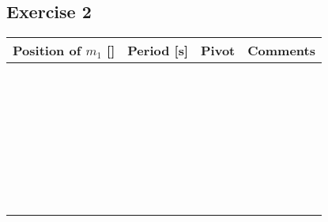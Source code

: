 \documentclass[a4paper,german,12pt,smallheadings]{scrartcl}
\begin{document}
\newpage

\subsection*{Exercise 2}

\begin{tabular}{l|l|l|l}
  Position of $m_1$ [\quad\quad] & Period [s] \qquad\qquad\qquad & Pivot & Comments \qquad\qquad\qquad\qquad\qquad\qquad\qquad\qquad \\
  \hline
   &  &  &  \\
  \hline
   &  &  &  \\
  \hline
   &  &  &  \\
  \hline
   &  &  &  \\
  \hline
   &  &  &  \\
  \hline
   &  &  &  \\
  \hline
   &  &  &  \\
  \hline
   &  &  &  \\
  \hline
   &  &  &  \\
  \hline
   &  &  &  \\
  \hline
   &  &  &  \\
  \hline
   &  &  &  \\
  \hline
   &  &  &  \\
  \hline
   &  &  &  \\
  \hline
   &  &  &  \\
  \hline
   &  &  &  \\
  \hline
   &  &  &  \\
  \hline
   &  &  &  \\
  \hline
   &  &  &  \\
  \hline
   &  &  &  \\
  \hline
   &  &  &  \\
  \hline
   &  &  &  \\
  \hline
   &  &  &  \\
  \hline
   &  &  &  \\
  \hline
   &  &  &  \\
  \hline
   &  &  &  \\
  \hline
   &  &  &  \\
  \hline
   &  &  &  \\
  \hline
   &  &  &  \\
  \hline
   &  &  &  \\
  \hline
   &  &  &  \\
  \hline
   &  &  &  \\
\end{tabular}
\end{document}
